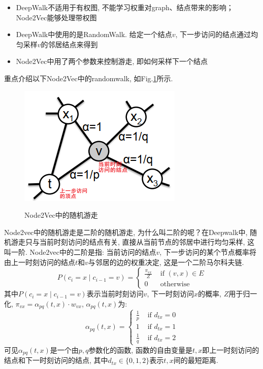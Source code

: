 \begin{itemize}
	\item DeepWalk不适用于有权图, 不能学习权重对graph、结点带来的影响；Node2Vec能够处理带权图
	\item DeepWalk中使用的是RandomWalk. 给定一个结点$v$, 下一步访问的结点通过均匀采样$v$的邻居结点来得到
	\item Node2Vec中用了两个参数来控制游走, 即如何采样下一个结点
\end{itemize}
重点介绍以下Node2Vec中的randomwalk, 如Fig.\ref{fig:node2vec}所示. 
\begin{figure}[h]
	\centering
	\includegraphics[width=.5\textwidth]{pics/node2vec.png}
	\label{fig:node2vec}
	\caption{Node2Vec中的随机游走}
\end{figure}
Node2vec中的随机游走是二阶的随机游走, 为什么叫二阶的呢？在Deepwalk中, 随机游走只与当前时刻访问的结点有关, 直接从当前节点的邻居中进行均匀采样, 这叫一阶. Node2vec中的二阶是指: 当前访问的结点$v$, 下一步访问的某个节点概率将由上一时刻访问的结点$t$和$v$与邻居的边的权重决定, 这是一个二阶马尔科夫链. 
$$
P(c_{i}=x \mid c_{i-1}=v)=\left\{\begin{array}{ll}
	\frac{\pi_{v x}}{Z} & \text { if }(v, x) \in E \\
	0 & \text { otherwise }
\end{array}\right.
$$
其中$P(c_{i}=x \mid c_{i-1}=v)$表示当前时刻访问$v$, 下一时刻访问$x$的概率, $Z$用于归一化, $\pi_{vx} = \alpha_{pq}(t,x) \cdot w_{vx}$, $\alpha_{pq}(t, x)$为: 
$$
\alpha_{p q}(t, x)=\left\{\begin{array}{ll}
	\frac{1}{p} & \text { if } d_{t x}=0 \\
	1 & \text { if } d_{t x}=1 \\
	\frac{1}{q} & \text { if } d_{t x}=2
\end{array}\right.
$$
可见$\alpha_{pq}(t, x)$是一个由$p, q$参数化的函数, 函数的自由变量是$t, x$即上一时刻访问的结点和下一时刻访问的结点, 其中$d_{tx} \in \{0, 1, 2\}$表示$t, x$间的最短距离. 

